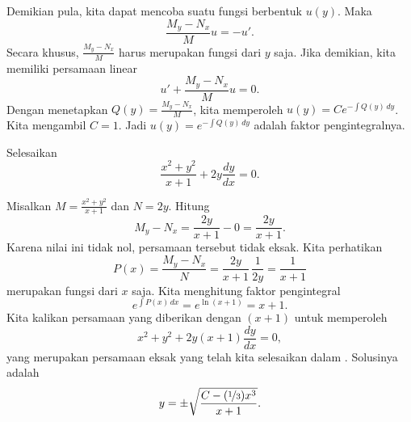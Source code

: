 Demikian pula, kita dapat mencoba suatu fungsi berbentuk $u(y)$.
Maka
\begin{equation*}
\frac{M_y-N_x}{M} u = - u' .
\end{equation*}
Secara khusus, $\frac{M_y-N_x}{M}$ harus merupakan fungsi dari $y$ saja.
Jika demikian, kita memiliki persamaan linear
\begin{equation*}
u' + \frac{M_y-N_x}{M} u = 0 .
\end{equation*}
Dengan menetapkan $Q(y) = \frac{M_y-N_x}{M}$,
kita memperoleh $u(y) = C e^{-\int Q(y) \, dy}$.  Kita
mengambil $C=1$.  Jadi $u(y) = e^{-\int Q(y) \, dy}$ adalah faktor pengintegralnya.

\begin{example}
Selesaikan
\begin{equation*}
\frac{x^2+y^2}{x+1} + 2y \frac{dy}{dx} = 0 .
\end{equation*}

Misalkan $M= \frac{x^2+y^2}{x+1}$ dan $N=2y$.
Hitung
\begin{equation*}
M_y-N_x = \frac{2y}{x+1} - 0 = \frac{2y}{x+1} .
\end{equation*}
Karena nilai ini tidak nol, persamaan tersebut tidak eksak.  Kita perhatikan
\begin{equation*}
P(x) = \frac{M_y-N_x}{N} = \frac{2y}{x+1} \, \frac{1}{2y} = \frac{1}{x+1}
\end{equation*}
merupakan fungsi dari $x$ saja.    Kita menghitung faktor pengintegral
\begin{equation*}
e^{\int  P(x) \, dx}
=
e^{\ln (x+1)} = x+1 .
\end{equation*}
Kita kalikan persamaan yang diberikan dengan $(x+1)$ untuk memperoleh
\begin{equation*}
x^2+y^2 + 2y(x+1) \frac{dy}{dx} = 0 ,
\end{equation*}
yang merupakan persamaan eksak yang telah kita selesaikan dalam
.  Solusinya adalah
\begin{equation*}
y = \pm \sqrt{\frac{C-(\nicefrac{1}{3})x^3}{x+1}} .
\end{equation*}
\end{example}

